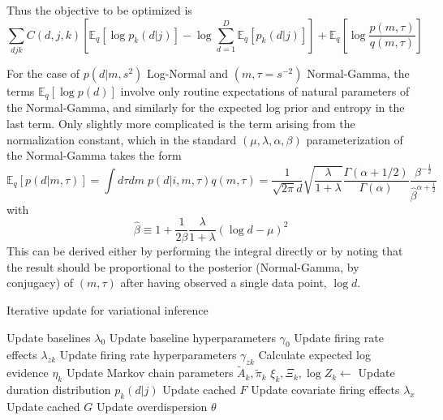 \documentclass[10pt,letterpaper]{article}
\begin{document}
Thus the objective to be optimized is
\begin{equation}
    \sum_{d j k} C(d, j, k) \left[\mathbb{E}_q \left[\log p_k(d|j)\right] - \log \sum_{d=1}^D \mathbb{E}_q\left[p_k(d|j) \right] \right] + \mathbb{E}_q\left[\log \frac{p(m, \tau)}{q(m, \tau)} \right]
\end{equation}

For the case of $p(d|m, s^2)$ Log-Normal and $(m, \tau = s^{-2})$ Normal-Gamma, the terms $\mathbb{E}_q[\log p(d)]$ involve only routine expectations of natural parameters of the Normal-Gamma, and similarly for the expected log prior and entropy in the last term. Only slightly more complicated is the term arising from the normalization constant, which in the standard $(\mu, \lambda, \alpha, \beta)$ parameterization of the Normal-Gamma takes the form
\begin{equation}
    \mathbb{E}_q[p(d|m, \tau)] = \int d\tau dm \; p(d|i, m, \tau) q(m, \tau)
    = \frac{1}{\sqrt{2\pi}d} \sqrt{\frac{\lambda}{1 + \lambda}}
    \frac{\Gamma(\alpha + 1/2)}{\Gamma(\alpha)}
    \frac{\beta^{-\frac{1}{2}}}{\hat{\beta}^{\alpha + \frac{1}{2}}}
\end{equation}
with
\begin{equation}
    \hat{\beta} \equiv 1 + \frac{1}{2\beta} \frac{\lambda}{1 + \lambda}
    (\log d - \mu)^2
\end{equation}
This can be derived either by performing the integral directly or by noting that the result should be proportional to the posterior (Normal-Gamma, by conjugacy) of $(m, \tau)$ after having observed a single data point, $\log d$.

\begin{algorithm}[ht]
\caption{Iterative update for variational inference}\label{algo}
\begin{algorithmic}[1]
    \State Update baselines $\lambda_0$
    \State Update baseline hyperparameters $\gamma_0$
        \State Update firing rate effects $\lambda_{zk}$
        \State Update firing rate hyperparameters $\gamma_{zk}$
        \State Calculate expected log evidence $\eta_k$
        \State Update Markov chain parameters $\tilde{A}_k, \tilde{\pi}_k$
        \State $\xi_k, \Xi_k, \log Z_k \gets$
            \State Update duration distribution $p_k(d|j)$
        \EndIf
        \State Update cached $F$
    \EndFor
    \State Update covariate firing effects $\lambda_x$
    \State Update cached $G$
    \State Update overdispersion $\theta$
\EndProcedure
\end{algorithmic}
\end{algorithm}
\end{document}
